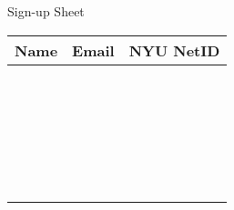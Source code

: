 \documentclass[11pt]{article}
\begin{document}
%
{Sign-up Sheet}

\begin{center}
  \renewcommand{\arraystretch}{1.5}
\begin{tabular}{|p{}|p{}|p{}|}
  \hline
  Name & Email & NYU NetID \\
  \hline
  && \\
  \hline
  && \\
  \hline
  && \\
  \hline
  && \\
  \hline
  && \\
  \hline
  && \\
  \hline
  && \\
  \hline
  && \\
  \hline
  && \\
  \hline
  && \\
  \hline
  && \\
  \hline
  && \\
  \hline
  && \\
  \hline
  && \\
  \hline
  && \\
  \hline
  && \\
  \hline
  && \\
  \hline
  && \\
  \hline
  && \\
  \hline
  && \\
  \hline
  && \\
  \hline
  && \\
  \hline
  && \\
  \hline
  && \\
  \hline
  && \\
  \hline
\end{tabular}
\end{center}
\end{document}

